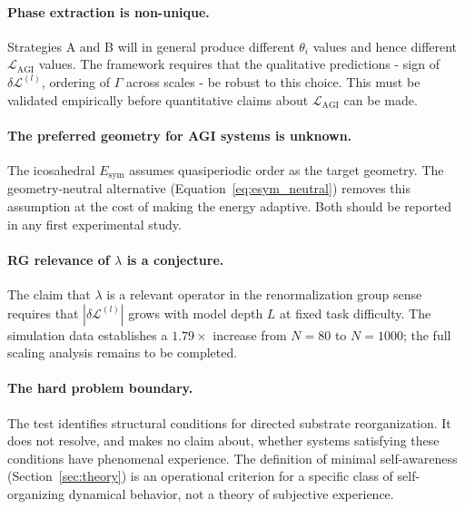 \documentclass[12pt,a4paper]{article}
\theoremstyle{plain}
\theoremstyle{definition}
\begin{document}
\paragraph{Phase extraction is non-unique.}
Strategies A and B will in general produce different $\theta_i$ values
and hence different $\mathcal{L}_{\text{AGI}}$ values. The framework
requires that the qualitative predictions - sign of
$\delta\mathcal{L}^{(l)}$, ordering of $\Gamma$ across scales - be
robust to this choice. This must be validated empirically before
quantitative claims about $\mathcal{L}_{\text{AGI}}$ can be made.

\paragraph{The preferred geometry for AGI systems is unknown.}
The icosahedral $E_{\text{sym}}$ assumes quasiperiodic order as the
target geometry. The geometry-neutral alternative
(Equation~\ref{eq:esym_neutral}) removes this assumption at the cost of
making the energy adaptive. Both should be reported in any first
experimental study.

\paragraph{RG relevance of $\lambda$ is a conjecture.}
The claim that $\lambda$ is a relevant operator in the renormalization
group sense requires that $|\delta\mathcal{L}^{(l)}|$ grows with model
depth $L$ at fixed task difficulty. The simulation data establishes a
$1.79\times$ increase from $N = 80$ to $N = 1000$; the full scaling
analysis remains to be completed.

\paragraph{The hard problem boundary.}
The test identifies structural conditions for directed substrate
reorganization. It does not resolve, and makes no claim about, whether
systems satisfying these conditions have phenomenal experience. The
definition of minimal self-awareness (Section~\ref{sec:theory}) is an
operational criterion for a specific class of self-organizing dynamical
behavior, not a theory of subjective experience.
\end{document}
